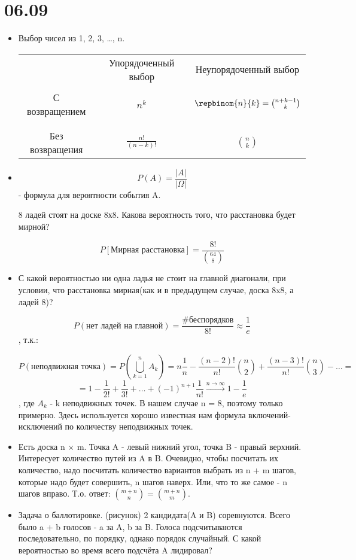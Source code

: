 
\author{Bugakova Nadya}
\section{06.09}
\begin{itemize}
	\item Выбор чисел из {1, 2, 3, \dots, n}.
	\begin{center}
	\begin{tabular}{cc|c}
	& Упорядоченный выбор & Неупорядоченный выбор \\
	& & \\
	С возвращением & $n^k$ & $\repbinom{n}{k} = \binom{n + k - 1}{k}$ \\
	& & \\
	\hline
	& & \\
	Без возвращения & $\frac{n!}{(n - k)!}$ & $\binom{n}{k}$ \\ 
	\end{tabular}
	\end{center}
	\item \[ \boxed{ P(A) = \frac{|A|}{|\Omega|} } \] - формула для вероятности события A.
	
	8 ладей стоят на доске 8х8. Какова вероятность того, что расстановка будет мирной?
	
	\[P[\text{Мирная расстановка}] = \frac{8!}{\binom{64}{8}}\]
	\item  С какой вероятностью ни одна ладья не стоит на главной диагонали, при условии, что расстановка мирная(как и в предыдущем случае, доска 8x8, а ладей 8)?
	
	\[P(\text{нет ладей на главной}) = \frac{\text{\# беспорядков}}{8!} \approx \frac{1}{e} \], т.к.:
	
	\[P(\text{неподвижная точка}) = P(\bigcup\limits_{k = 1}^n A_k) = n \frac{1}{n} - \frac{(n - 2)!}{n!}\binom{n}{2} + \frac{(n - 3)!}{n!}\binom{n}{3} - \dots = \]
	\[ = 1 - \frac{1}{2!} + \frac{1}{3!} + \dots + (-1)^{n + 1}\frac{1}{n!} \xrightarrow{n \rightarrow \infty} 1 - \frac{1}{e}\], где $A_k$ - k неподвижных точек. В нашем случае n = 8, поэтому только примерно. Здесь используется хорошо известная нам формула включений-исключений по количеству неподвижных точек.
	\item Есть доска n $\times$ m. Точка A - левый нижний угол, точка B - правый верхний. Интересует количество путей из A в B. Очевидно, чтобы посчитать их количество, надо посчитать количество вариантов выбрать из n + m шагов, которые надо будет совершить, n шагов наверх. Или, что то же самое - n шагов вправо. Т.о. ответ: $\binom{m + n}{n} = \binom{m + n}{m}$. 
	\item Задача о баллотировке. (рисунок) 2 кандидата(A и B) соревнуются. Всего было a + b голосов - a за A, b за B. Голоса подсчитываются последовательно, по порядку, однако порядок случайный. С какой вероятностью во время всего подсчёта A лидировал?
	

\end{itemize}
